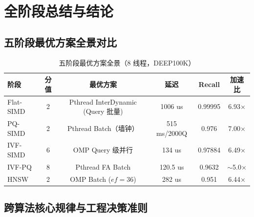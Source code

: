 \documentclass[UTF8,a4paper,10pt]{ctexart}
\begin{document}
\section{全阶段总结与结论}

\subsection{五阶段最优方案全景对比}

\begin{table}[H]
\centering
\caption{五阶段最优方案全景（8 线程，DEEP100K）}
\begin{tabular}{lccccc}
\hline
阶段 & 分值 & 最优方案 & 延迟 & Recall & 加速比 \\
\hline
Flat-SIMD & 2 & Pthread InterDynamic (Query 批量) & 1006 us & 0.99995 & 6.93× \\
PQ-SIMD & 2 & Pthread Batch（墙钟） & 515 ms/2000Q & 0.976 & 7.00× \\
IVF-SIMD & 6 & OMP Query 级并行 & 134 us & 0.97884 & 6.49× \\
IVF-PQ & 8 & Pthread FA Batch & 120.5 us & 0.9632 & $\sim$5.0× \\
HNSW & 2 & OMP Batch ($ef=36$) & 282 us & 0.951 & 6.44× \\
\hline
\end{tabular}
\end{table}

\subsection{跨算法核心规律与工程决策准则}
\end{document}
